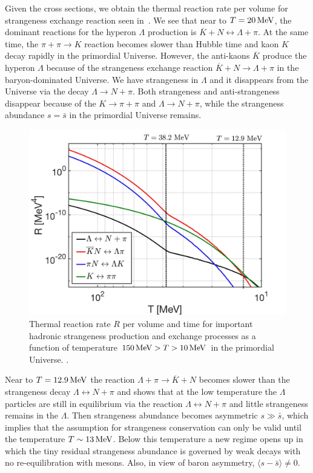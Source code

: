 Given the cross sections, we obtain the thermal reaction rate per volume for strangeness exchange reaction seen in~. We see that near to $T=20\text{\,MeV}$, the dominant reactions for the hyperon $\Lambda$ production is $\overline{K}+N\leftrightarrow\Lambda+\pi$. At the same time, the $\pi+\pi\to K$ reaction becomes slower than Hubble time and kaon $K$ decay rapidly in the primordial Universe. However, the anti-kaons $\overline K$ produce the hyperon $\Lambda$ because of the strangeness exchange reaction $\overline{K}+N\rightarrow\Lambda+\pi$ in the baryon-dominated Universe. We have strangeness in $\Lambda$ and it disappears from the Universe via the decay $\Lambda\rightarrow N+\pi$. Both strangeness and anti-strangeness disappear because of the $K\rightarrow\pi+\pi$ and $\Lambda\rightarrow N+\pi$, while the strangeness abundance $s = \bar{s}$ in the primordial Universe remains.

\begin{figure} 
\centerline{\includegraphics[width=0.9\linewidth]{./plots/NewHyperonRate_C.jpg}}
\caption{Thermal reaction rate $R$ per volume and time for important hadronic strangeness production and exchange processes as a function of temperature $150\text{\,MeV}> T>10\text{\,MeV}$ in the primordial Universe. . }
\label{Lambda_Rate_volume.fig} 
\end{figure}

Near to $T=12.9\text{\,MeV}$ the reaction $\Lambda+\pi\rightarrow\overline{K}+N$ becomes slower than the strangeness decay $\Lambda\leftrightarrow N+\pi$ and shows that at the low temperature the $\Lambda$ particles are still in equilibrium via the reaction $\Lambda\leftrightarrow N+\pi$ and little strangeness remains in the $\Lambda$. Then strangeness abundance becomes asymmetric $s\gg \bar{s}$, which implies that the assumption for strangeness conservation can only be valid until the temperature $T\sim13\text{\,MeV}$. Below this temperature a new regime opens up in which the tiny residual strangeness abundance is governed by weak decays with no re-equilibration with mesons. Also, in view of baron asymmetry, $\langle s-\bar s\rangle \ne 0$.

